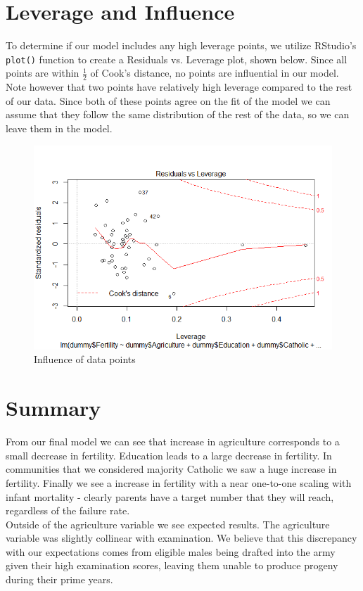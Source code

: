 \documentclass[preprint,12pt]{elsarticle}
\begin{document}
\pagebreak

\section*{Leverage and Influence}

\noindent To determine if our model includes any high leverage points, we utilize RStudio's \verb|plot()| function to create a Residuals vs. Leverage plot, shown below. Since all points are within $\frac{1}{2}$ of Cook's distance, no points are influential in our model. Note however that two points have relatively high leverage compared to the rest of our data. Since both of these points agree on the fit of the model we can assume that they follow the same distribution of the rest of the data, so we can leave them in the model.

\begin{figure}[h!]
\centering\includegraphics[width=0.7\linewidth]{Influentiality.PNG}
\caption{Influence of data points}
\end{figure}

\section*{Summary}
\noindent From our final model we can see that increase in agriculture corresponds to a small decrease in fertility. Education leads to a large decrease in fertility. In communities that we considered majority Catholic we saw a huge increase in fertility. Finally we see a increase in fertility with a near one-to-one scaling with infant mortality - clearly parents have a target number that they will reach, regardless of the failure rate. \\

\noindent Outside of the agriculture variable we see expected results. The agriculture variable was slightly collinear with examination. We believe that this discrepancy with our expectations comes from eligible males being drafted into the army given their high examination scores, leaving them unable to produce progeny during their prime years.\\
\newpage
\end{document}
